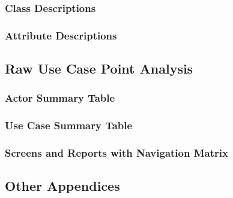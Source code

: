 	
    \subsubsection{Class Descriptions}
    \subsubsection{Attribute Descriptions}
  \subsection{Raw Use Case Point Analysis}
    \subsubsection{Actor Summary Table}
    \subsubsection{Use Case Summary Table}
    \subsubsection{Screens and Reports with Navigation Matrix}
  \subsection{Other Appendices}
